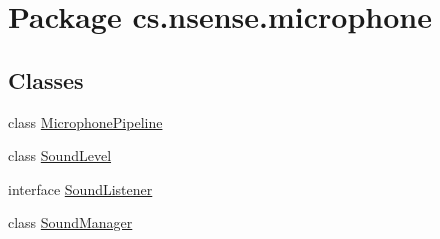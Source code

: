 \hypertarget{namespacecs_1_1nsense_1_1microphone}{\section{Package cs.\-nsense.\-microphone}
\label{namespacecs_1_1nsense_1_1microphone}
}
\subsection*{Classes}
\begin{DoxyCompactItemize}
\item 
class \hyperlink{classcs_1_1nsense_1_1microphone_1_1_microphone_pipeline}{Microphone\-Pipeline}
\item 
class \hyperlink{classcs_1_1nsense_1_1microphone_1_1_sound_level}{Sound\-Level}
\item 
interface \hyperlink{interfacecs_1_1nsense_1_1microphone_1_1_sound_listener}{Sound\-Listener}
\item 
class \hyperlink{classcs_1_1nsense_1_1microphone_1_1_sound_manager}{Sound\-Manager}
\end{DoxyCompactItemize}


